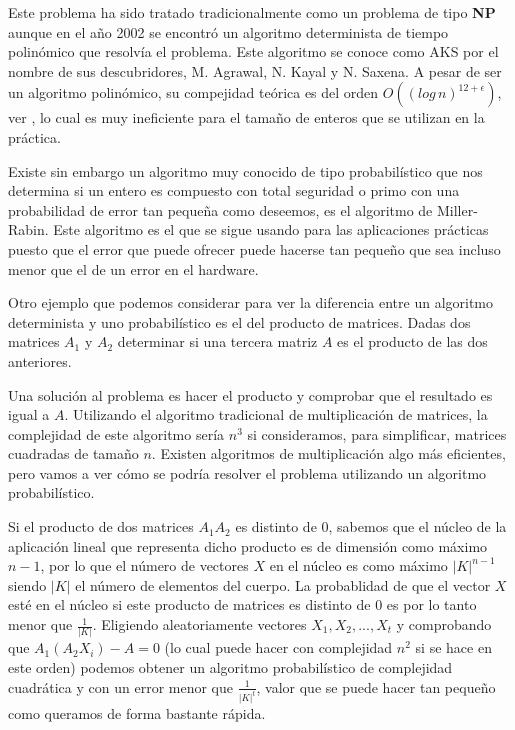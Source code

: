 Este problema ha sido tratado tradicionalmente como un problema de tipo \textbf{NP} aunque en el a\~no 2002 se encontr\'o un algoritmo determinista de tiempo polin\'omico que resolv\'ia el problema. Este algoritmo se conoce como AKS por el nombre de sus descubridores, M. Agrawal, N. Kayal y N. Saxena. A pesar de ser un algoritmo polin\'omico, su compejidad te\'orica es del orden $O((log\, n)^{12+\epsilon})$, ver \citep[Página 314]{Pardo}, lo cual es muy ineficiente para el tama\~no de enteros que se utilizan en la
pr\'actica.

Existe sin embargo un algoritmo muy conocido de tipo probabil\'istico que nos determina si un entero es compuesto con total seguridad o primo con una probabilidad de error tan peque\~na como deseemos, es el algoritmo de Miller-Rabin. Este algoritmo es el que se sigue usando para las aplicaciones pr\'acticas puesto que el error que puede ofrecer puede hacerse tan peque\~no que sea incluso menor que el de un error en el hardware.

Otro ejemplo que podemos considerar para ver la diferencia entre un algoritmo determinista y uno probabil\'istico es el del producto de matrices. Dadas dos matrices $A_1$ y $A_2$ determinar si una tercera matriz $A$ es el producto de las dos anteriores.

Una soluci\'on al problema es hacer el producto y comprobar que el resultado es igual a $A$. Utilizando el algoritmo tradicional de multiplicaci\'on de matrices, la complejidad de este algoritmo ser\'ia $n^3$ si consideramos, para simplificar, matrices cuadradas de tama\~no $n$.  Existen algoritmos de multiplicaci\'on algo m\'as eficientes, pero vamos a ver c\'omo se podr\'ia resolver el problema utilizando un algoritmo probabil\'istico.

Si el producto de dos matrices $A_1 A_2$ es distinto de $0$, sabemos que el n\'ucleo de la aplicaci\'on lineal que representa dicho producto es de dimensi\'on como m\'aximo $n-1$, por lo que el n\'umero de vectores $X$ en el n\'ucleo es como m\'aximo $|K|^{n-1}$ siendo $|K|$ el n\'umero de elementos del cuerpo. La probablidad de que el vector $X$ est\'e en el n\'ucleo si este producto de matrices es distinto de $0$ es por lo tanto menor que $\frac{1}{|K|}$. Eligiendo aleatoriamente vectores $X_1, X_2, ..., X_t$ y comprobando que $A_1 (A_2 X_i)-A=0$ (lo cual puede hacer con complejidad $n^2$ si se hace en este orden) podemos obtener un algoritmo probabil\'istico de complejidad cuadr\'atica y con un error menor que $\frac{1}{|K|^t}$, valor que se puede hacer tan peque\~no como queramos de forma bastante r\'apida.
